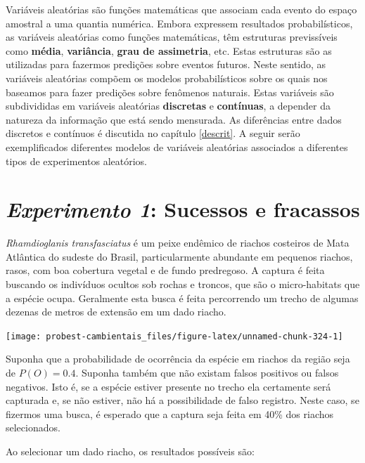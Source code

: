 \documentclass[
]{book}
\begin{document}
Variáveis aleatórias são funções matemáticas que associam cada evento do espaço amostral a uma quantia numérica. Embora expressem resultados probabilísticos, as variáveis aleatórias como funções matemáticas, têm estruturas previssíveis como \textbf{média}, \textbf{variância}, \textbf{grau de assimetria}, etc. Estas estruturas são as utilizadas para fazermos predições sobre eventos futuros. Neste sentido, as variáveis aleatórias compõem os modelos probabilísticos sobre os quais nos baseamos para fazer predições sobre fenômenos naturais. Estas variáveis são subdivididas em variáveis aleatórias \textbf{discretas} e \textbf{contínuas}, a depender da natureza da informação que está sendo mensurada. As diferências entre dados discretos e contínuos é discutida no capítulo \ref{descrit}. A seguir serão exemplificados diferentes modelos de variáveis aleatórias associados a diferentes tipos de experimentos aleatórios.

\hypertarget{experimento-1-sucessos-e-fracassos}{%
\section{\texorpdfstring{\emph{Experimento 1}: Sucessos e fracassos}{Experimento 1: Sucessos e fracassos}}\label{experimento-1-sucessos-e-fracassos}}

\emph{Rhamdioglanis transfasciatus} é um peixe endêmico de riachos costeiros de Mata Atlântica do sudeste do Brasil, particularmente abundante em pequenos riachos, rasos, com boa cobertura vegetal e de fundo predregoso. A captura é feita buscando os indivíduos ocultos sob rochas e troncos, que são o micro-habitats que a espécie ocupa. Geralmente esta busca é feita percorrendo um trecho de algumas dezenas de metros de extensão em um dado riacho.

\begin{center}\texttt{[image: probest-cambientais\_files/figure-latex/unnamed-chunk-324-1]} \end{center}

Suponha que a probabilidade de ocorrência da espécie em riachos da região seja de \(P(O) = 0.4\). Suponha também que não existam falsos positivos ou falsos negativos. Isto é, se a espécie estiver presente no trecho ela certamente será capturada e, se não estiver, não há a possibilidade de falso registro. Neste caso, se fizermos uma busca, é esperado que a captura seja feita em 40\% dos riachos selecionados.

Ao selecionar um dado riacho, os resultados possíveis são:
\end{document}
